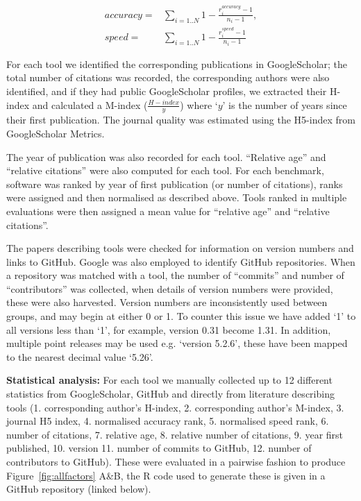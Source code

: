 \documentclass[fleqn,10pt]{SelfArx} %
\begin{document}
\begin{equation*}
\begin{split}
accuracy =& \sum_{i=1..N} 1-\frac{r^{accuracy}_i-1}{n_i-1}, \\
speed    =& \sum_{i=1..N} 1-\frac{r^{speed   }_i-1}{n_i-1}
\end{split}
\end{equation*}
 
For each tool we identified the corresponding publications in
GoogleScholar; the total number of citations was recorded, the
corresponding authors were also identified, and if they had public
GoogleScholar profiles, we extracted their H-index and calculated a
M-index ($\frac{H-index}{y}$) where ‘$y$’ is the number of years since
their first publication. The journal quality was estimated using the H5-index
from GoogleScholar Metrics. 

The year of publication was also recorded for each
tool. “Relative age” and “relative citations” were also computed for
each tool. For each benchmark, software was ranked by year of first
publication (or number of citations), ranks were assigned and then
normalised as described above. Tools ranked in multiple evaluations
were then assigned a mean value for “relative age” and “relative
citations”.

The papers describing tools were checked for information on version numbers and links to GitHub. 
Google was also employed to identify GitHub repositories. When a repository was matched with a tool, the number of ``commits'' and number of ``contributors'' was collected, when details of version numbers were provided, these were also harvested. 
Version numbers are inconsistently used between groups, and may begin at either 0 or 1. To counter this issue we have added `1' to all versions less than `1', for example, version 0.31 become 1.31. In addition, multiple point releases may be used e.g. `version 5.2.6', these have been mapped to the nearest decimal value `5.26'.

\textbf{Statistical analysis:} For each tool we manually collected up to 12 different
statistics from GoogleScholar, GitHub and directly from literature describing tools 
(1. corresponding author’s H-index, 
2. corresponding author’s M-index, 
3. journal H5 index, 
4. normalised accuracy rank, 
5. normalised speed rank, 
6. number of citations, 
7. relative age, 
8. relative number of citations, 
9. year first published, 
10. version
11. number of commits to GitHub,
12. number of contributors to GitHub). 
These were evaluated in a pairwise fashion to
produce Figure~\ref{fig:allfactors} A\&B, the R code used to generate these is
given in a GitHub repository (linked below).
\end{document}

